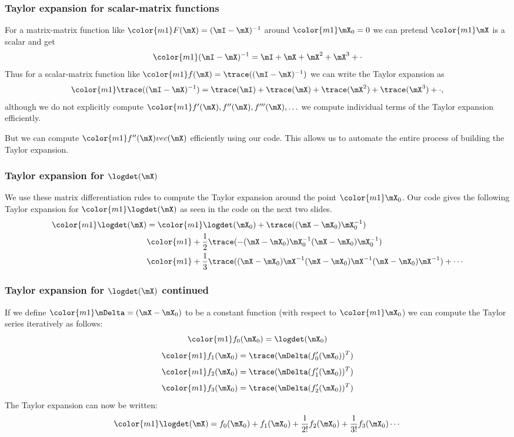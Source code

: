 \begin{frame}
\frametitle{Taylor expansion for scalar-matrix functions}
For a matrix-matrix function like $\color{m1} F(\mX)=(\mI-\mX)^{-1}$ around $\color{m1}\mX_0=0$
we can pretend $\color{m1}\mX$ is a scalar and get
$$\color{m1}
(\mI-\mX)^{-1}= \mI+\mX+\mX^2+\mX^3+\cdot
$$
Thus for a scalar-matrix function like $\color{m1}f(\mX)=\trace((\mI-\mX)^{-1})$ we can
write the Taylor expansion as
$$\color{m1}
\trace((\mI-\mX)^{-1})= \trace(\mI)+\trace(\mX)+\trace(\mX^2)+\trace(\mX^3)+\cdot,
$$
although we do not explicitly compute $\color{m1}f'(\mX), f''(\mX), f'''(\mX),\ldots$
we compute individual terms of the Taylor expansion efficiently.

But we can compute $\color{m1}f''(\mX)vec(\mX)$ efficiently using our code.  This allows 
us to automate the entire process of building the Taylor expansion.
\end{frame}

\begin{frame}[fragile]
\frametitle{Taylor expansion for $\logdet(\mX)$}
We use these matrix differentiation rules to compute the Taylor expansion around the point $\color{m1}\mX_0$.  
Our code gives the following Taylor expansion for $\color{m1}\logdet(\mX)$ as seen in the code on the next two slides.
\begin{equation*}
\begin{split}
\color{m1} \logdet(\mX) &= \color{m1}\logdet(\mX_0) + \trace((\mX-\mX_0)\mX_0^{-1}) \\
         &\color{m1}+\frac{1}{2}\trace(-(\mX-\mX_0)\mX_0^{-1}(\mX-\mX_0)\mX_0^{-1}) \\
         &\color{m1}+ \frac{1}{3}\trace((\mX-\mX_0)\mX^{-1}(\mX-\mX_0)\mX^{-1}(\mX-\mX_0)\mX^{-1})+\cdots
\end{split}
\end{equation*}
\end{frame}

\begin{frame}[fragile]
\frametitle{Taylor expansion for $\logdet(\mX)$ continued}
If we define $\color{m1}\mDelta=(\mX-\mX_0)$ to be a constant function (with respect to $\color{m1}\mX_0$)
we can compute the Taylor series iteratively as follows:
\begin{equation*}
\color{m1}f_0(\mX_0) = \logdet(\mX_0) 
\end{equation*}
\begin{equation*}
\color{m1}f_1(\mX_0) = \trace(\mDelta(f_0'(\mX_0))^{T})
\end{equation*}
\begin{equation*}
\color{m1}f_2(\mX_0) = \trace(\mDelta(f_1'(\mX_0))^{T})
\end{equation*}
\begin{equation*}
\color{m1}f_3(\mX_0) = \trace(\mDelta(f_2'(\mX_0))^{T})
\end{equation*}
The Taylor expansion can now be written:
$$
\color{m1} \logdet(\mX) = f_0(\mX_0) + f_1(\mX_0) + \frac{1}{2!}f_2(\mX_0) + \frac{1}{3!}f_3(\mX_0) \cdots
$$
\end{frame}

